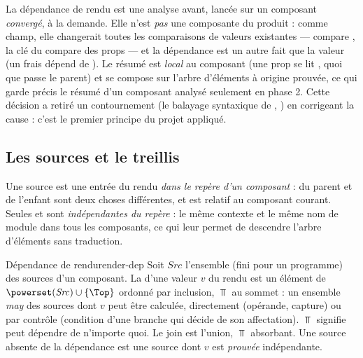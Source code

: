 \begin{decision}
La dépendance de rendu est une analyse avant, lancée sur un composant \emph{convergé}, à la
demande. Elle n'est \emph{pas} une composante du produit  : comme champ, elle
changerait toutes les comparaisons de valeurs existantes --- 
compare , la clé du  compare des props --- et la
dépendance est un autre fait que la valeur (un  frais dépend de ).
Le résumé est \emph{local} au composant (une prop se lit , quoi que passe le
parent) et se compose sur l'arbre d'éléments à origine prouvée, ce qui garde précis le résumé
d'un composant analysé seulement en phase 2. Cette décision a retiré un contournement
(le balayage syntaxique de , ) en corrigeant la cause : c'est le
premier principe du projet appliqué.
\end{decision}

\subsection{Les sources et le treillis }


Une source est une entrée du rendu \emph{dans le repère d'un composant} :  du
parent et  de l'enfant sont deux choses différentes, et  est
relatif au composant courant. Seules  et  sont
\emph{indépendantes du repère} : le même contexte et le même nom de module dans tous les
composants, ce qui leur permet de descendre l'arbre d'éléments sans traduction.

\begin{definition}{Dépendance de rendu}{render-dep}
Soit $\mathit{Src}$ l'ensemble (fini pour un programme) des sources d'un composant. La
 d'une valeur $v$ du rendu est un élément de
$\powerset(\mathit{Src}) \cup \{\Top\}$ ordonné par inclusion, $\Top$ au sommet : un ensemble
\emph{may} des sources dont $v$ peut être calculée, directement (opérande, capture) ou par
contrôle (condition d'une branche qui décide de son affectation). $\Top$ signifie \og peut
dépendre de n'importe quoi\fg. Le join est l'union, $\Top$ absorbant. Une source absente de la
dépendance est une source dont $v$ est \emph{prouvée} indépendante.
\end{definition}

